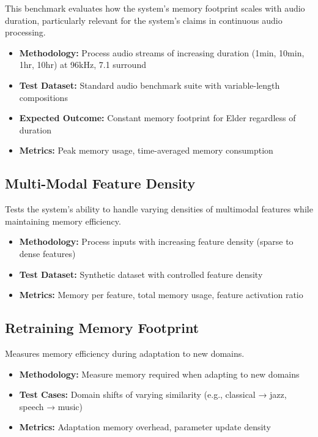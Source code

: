 This benchmark evaluates how the system's memory footprint scales with audio duration, particularly relevant for the system's claims in continuous audio processing.

\begin{itemize}
    \item \textbf{Methodology:} Process audio streams of increasing duration (1min, 10min, 1hr, 10hr) at 96kHz, 7.1 surround
    \item \textbf{Test Dataset:} Standard audio benchmark suite with variable-length compositions
    \item \textbf{Expected Outcome:} Constant memory footprint for Elder regardless of duration
    \item \textbf{Metrics:} Peak memory usage, time-averaged memory consumption
\end{itemize}

\subsection{Multi-Modal Feature Density}

Tests the system's ability to handle varying densities of multimodal features while maintaining memory efficiency.

\begin{itemize}
    \item \textbf{Methodology:} Process inputs with increasing feature density (sparse to dense features)
    \item \textbf{Test Dataset:} Synthetic dataset with controlled feature density
    \item \textbf{Metrics:} Memory per feature, total memory usage, feature activation ratio
\end{itemize}

\subsection{Retraining Memory Footprint}

Measures memory efficiency during adaptation to new domains.

\begin{itemize}
    \item \textbf{Methodology:} Measure memory required when adapting to new domains
    \item \textbf{Test Cases:} Domain shifts of varying similarity (e.g., classical → jazz, speech → music)
    \item \textbf{Metrics:} Adaptation memory overhead, parameter update density
\end{itemize}

